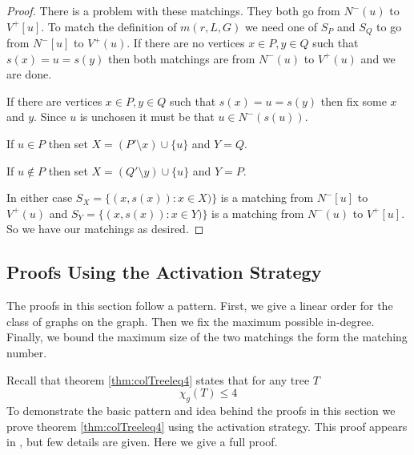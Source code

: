 \begin{proof}
    There is a problem with these matchings. They both go from $N^-(u)$ to $V^+[u]$. To match the definition of $m(r,L,G)$ we need one of $S_P$ and $S_Q$ to go from $N^-[u]$ to $V^+(u)$. If there are no vertices $x\in P, y\in Q$ such that $s(x)=u=s(y)$ then both matchings are from $N^-(u)$ to $V^+(u)$ and we are done. 
    
    If there are vertices $x\in P, y\in Q$ such that $s(x)=u=s(y)$ then fix some $x$ and $y$. Since $u$ is unchosen it must be that $u \in N^-(s(u))$. 
    
    If $u\in P$ then set $X = (P'\setminus x) \cup\{u\}$ and $Y= Q$. 
    
    If $u\notin P$ then set $X = (Q'\setminus y) \cup\{u\}$ and $Y= P$.
    
    In either case $S_X= \{(x,s(x)):x\in X)\}$ is a matching from $N^-[u]$ to $V^+(u)$ and $S_Y= \{(x,s(x)):x\in Y)\}$ is a matching from $N^-(u)$ to $V^+[u]$. So we have our matchings as desired.
\end{proof}


\subsection{Proofs Using the Activation Strategy} \label{sec:actvStratProofs}
The proofs in this section follow a pattern. First, we give a linear order for the class of graphs on the graph. Then we fix the maximum possible in-degree. Finally, we bound the maximum size of the two matchings the form the matching number. 

Recall that theorem \ref{thm:colTreeleq4} states that for any tree $T$ \[\chi_g(T)\leq 4\]
To demonstrate the basic pattern and idea behind the proofs in this section we prove theorem \ref{thm:colTreeleq4} using the activation strategy. This proof appears in \cite{KIERSTEAD2000}, but few details are given. Here we give a full proof. 

